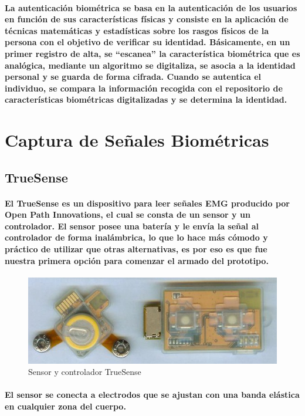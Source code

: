 \documentclass{article}
\begin{document}
\paragraph{
La autenticación biométrica se basa en la autenticación de los usuarios en función de sus características físicas y consiste en la aplicación de técnicas matemáticas y estadísticas sobre los rasgos físicos de la persona con el objetivo de verificar su identidad. Básicamente, en un primer registro de alta, se “escanea” la característica biométrica que es analógica, mediante un algoritmo se digitaliza, se asocia a la identidad personal y se guarda de forma cifrada. Cuando se autentica el individuo, se compara la información recogida con el repositorio de características biométricas digitalizadas y se determina la identidad. \cite{esparza2017}
}
\section{Captura de Señales Biométricas}
\subsection{TrueSense}
\paragraph{
El TrueSense es un dispositivo para leer señales EMG producido por Open Path Innovations, el cual se consta de un sensor y un controlador. El sensor posee una batería y le envía la señal al controlador de forma inalámbrica, lo que lo hace más cómodo y práctico de utilizar que otras alternativas, es por eso es que fue nuestra primera opción para comenzar el armado del prototipo.
}

\begin{figure}[ht]
    \centering
    \includegraphics[scale=1]{truesense}
    \caption{Sensor y controlador TrueSense}
    \label{fig:truesense}
\end{figure}

\paragraph{
El sensor se conecta a electrodos que se ajustan con una banda elástica en cualquier zona del cuerpo.
}
\end{document}
